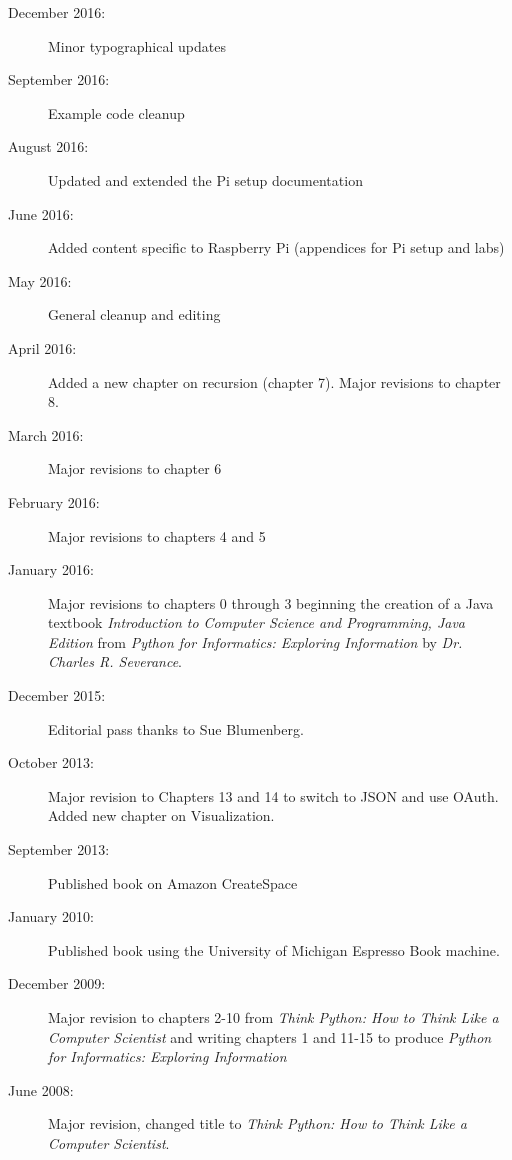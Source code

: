 \begin{latexonly}
{\begin{description}
\item[December 2016:] Minor typographical updates

\item[September 2016:] Example code cleanup

\item[August 2016:] Updated and extended the Pi setup documentation

\item[June 2016:] Added content specific to Raspberry Pi (appendices for Pi setup and labs)

\item[May 2016:] General cleanup and editing

\item[April 2016:] Added a new chapter on recursion (chapter 7). Major revisions to chapter 8.

\item[March 2016:] Major revisions to chapter 6

\item[February 2016:] Major revisions to chapters 4 and 5

\item[January 2016:] Major revisions to chapters 0 through 3 beginning the creation of a Java textbook \emph{Introduction to Computer Science and Programming, Java Edition} from \emph{Python for Informatics: Exploring Information} by \emph{Dr. Charles R. Severance}.

\item[December 2015:] Editorial pass thanks to Sue Blumenberg.

\item[October 2013:] Major revision to Chapters 13 and 14
to switch to JSON and use OAuth.
Added new chapter on Visualization.

\item[September 2013:] Published book on Amazon CreateSpace

\item[January 2010:] Published book using the University of 
Michigan Espresso Book machine.

\item[December 2009:] Major revision to chapters 2-10 from
\emph{Think Python: How to Think Like
a Computer Scientist}
and writing chapters 1 and 11-15 to
produce 
\emph{Python for Informatics: Exploring Information}

\item[June 2008:] Major revision, changed title to
\emph{Think Python: How to Think Like
a Computer Scientist}.


\end{description}}
\end{latexonly}

